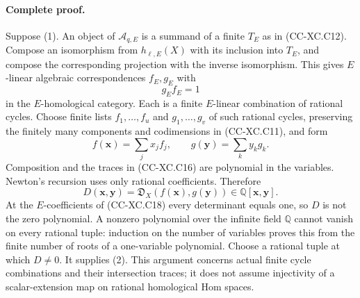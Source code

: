 \paragraph{Complete proof.}
Suppose (1).  An object of \(\mathcal A_{q,E}\) is a summand
of a finite \(T_E\) as in (CC-XC.C12).  Compose an isomorphism
from \(h_{\ell,E}(X)\) with its inclusion into \(T_E\), and
compose the corresponding projection with the inverse
isomorphism.  This gives \(E\)-linear algebraic
correspondences \(f_E,g_E\) with
\[
                                  g_E f_E=1
                                                        \tag{CC-XC.C18}
\]
in the \(E\)-homological category.
Each is a finite \(E\)-linear combination of rational
cycles.  Choose finite lists \(f_1,\ldots,f_u\) and
\(g_1,\ldots,g_v\) of such rational cycles, preserving
the finitely many components and codimensions in
(CC-XC.C11), and form
\[
 f(\mathbf x)=\sum_jx_jf_j,\qquad
 g(\mathbf y)=\sum_ky_kg_k.
 \]
Composition and the traces in (CC-XC.C16) are polynomial
in the variables.  Newton's recursion uses only rational
coefficients.  Therefore
\[
        D(\mathbf x,\mathbf y)
               =\mathfrak D_X(f(\mathbf x),g(\mathbf y))
                         \in\mathbb Q[\mathbf x,\mathbf y].
                                                        \tag{CC-XC.C19}
\]
At the \(E\)-coefficients of (CC-XC.C18) every determinant
equals one, so \(D\) is not the zero polynomial.
A nonzero polynomial over the infinite field \(\mathbb Q\)
cannot vanish on every rational tuple: induction on the
number of variables proves this from the finite number of
roots of a one-variable polynomial.  Choose a rational
tuple at which \(D\ne0\).  It supplies (2).
This argument concerns actual finite cycle combinations
and their intersection traces; it does not assume
injectivity of a scalar-extension map on rational
homological Hom spaces.

